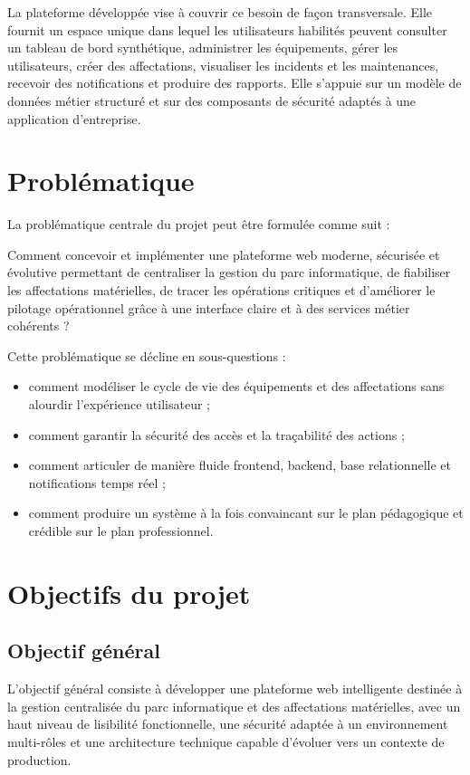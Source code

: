 ﻿\documentclass[12pt,a4paper,oneside]{report}
\begin{document}
La plateforme développée vise à couvrir ce besoin de façon transversale. Elle fournit un espace unique dans lequel les utilisateurs habilités peuvent consulter un tableau de bord synthétique, administrer les équipements, gérer les utilisateurs, créer des affectations, visualiser les incidents et les maintenances, recevoir des notifications et produire des rapports. Elle s'appuie sur un modèle de données métier structuré et sur des composants de sécurité adaptés à une application d'entreprise.

\section{Problématique}
La problématique centrale du projet peut être formulée comme suit :

\begin{keybox}[Problématique]
Comment concevoir et implémenter une plateforme web moderne, sécurisée et évolutive permettant de centraliser la gestion du parc informatique, de fiabiliser les affectations matérielles, de tracer les opérations critiques et d'améliorer le pilotage opérationnel grâce à une interface claire et à des services métier cohérents ?
\end{keybox}

Cette problématique se décline en sous-questions :
\begin{itemize}
  \item comment modéliser le cycle de vie des équipements et des affectations sans alourdir l'expérience utilisateur ;
  \item comment garantir la sécurité des accès et la traçabilité des actions ;
  \item comment articuler de manière fluide frontend, backend, base relationnelle et notifications temps réel ;
  \item comment produire un système à la fois convaincant sur le plan pédagogique et crédible sur le plan professionnel.
\end{itemize}

\section{Objectifs du projet}
\subsection{Objectif général}
L'objectif général consiste à développer une plateforme web intelligente destinée à la gestion centralisée du parc informatique et des affectations matérielles, avec un haut niveau de lisibilité fonctionnelle, une sécurité adaptée à un environnement multi-rôles et une architecture technique capable d'évoluer vers un contexte de production.
\end{document}
